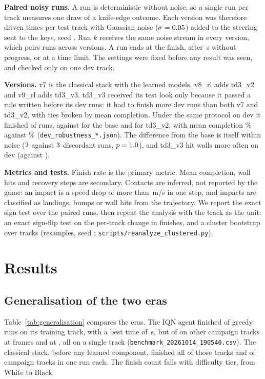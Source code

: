 \documentclass[conference]{IEEEtran}
\newcommand{\vseven}{v7\xspace}
\newcommand{\veight}{v8\_rl\xspace}
\newcommand{\vnine}{v9\_rl\xspace}
\begin{document}
\textbf{Paired noisy runs.} A run is deterministic without noise, so a single run per track measures one
draw of a knife-edge outcome. Each version was therefore driven \RunsPerMap times per test track with
Gaussian noise ($\sigma=0.05$) added to the steering sent to the keys, seed \NoiseSeed. Run $k$
receives the same noise stream in every version, which pairs runs across versions. A run ends at the finish,
after \StuckCutoff\,s without progress, or at a time limit. The settings were fixed before any result was
seen, and checked only on one dev track.

\textbf{Versions.} \vseven is the classical stack with the learned models. \veight adds td3\_v2 and \vnine
adds td3\_v3. td3\_v3 received its test look only because it passed a rule written before its dev runs: it
had to finish more dev runs than both \vseven and td3\_v2, with ties broken by mean completion. Under the
same protocol on dev it finished \DevVthreeFin of \DevRuns runs, against \DevBaseFin for the base and
\DevVtwoFin for td3\_v2, with mean completion \DevVthreeCompl\% against \DevVtwoCompl\%
(\texttt{dev\_robustness\_*.json}). The difference from the base is itself within noise
($2$ against $3$ discordant runs, $p=1.0$), and td3\_v3 hit walls more often on dev
(\DevVthreeWalls against \DevBaseWalls).

\textbf{Metrics and tests.} Finish rate is the primary metric. Mean completion, wall hits and recovery steps
are secondary. Contacts are inferred, not reported by the game: an impact is a speed drop of more than
\ImpactDrop\,m/s in one step, and impacts are classified as landings, bumps or wall hits from the trajectory.
We report the exact sign test over the \TestRuns paired runs, then repeat the analysis with the track as the
unit: an exact sign-flip test on the per-track change in finishes, and a cluster bootstrap over tracks
(\BootResamples resamples, seed \ReanalysisSeed; \texttt{scripts/reanalyze\_clustered.py}).

\section{Results}
\label{sec:results}

\subsection{Generalisation of the two eras}

Table~\ref{tab:generalisation} compares the eras. The IQN agent finished \IQNHockFin of \IQNHockRuns greedy
runs on its training track, with a best time of \IQNHockBest\,s, but \IQNFirstOther of \IQNOtherRuns on \IQNOtherMaps
other campaign tracks at \IQNFirstFrames frames and \IQNLastOther at \IQNLastFrames, all \IQNLastAthree on a
single track (\texttt{benchmark\_20261014\_190540.csv}). The classical stack, before any learned component,
finished all \StackEraOneMapsFin of those tracks and \CampaignFin of \CampaignMaps campaign tracks in one run
each. The finish count falls with difficulty tier, from White to Black.
\end{document}
